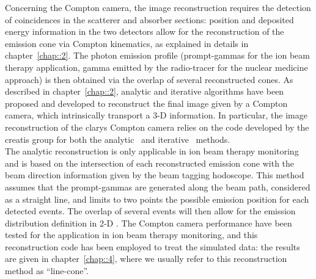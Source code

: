 Concerning the Compton camera, the image reconstruction requires the detection of coincidences in the scatterer and absorber sections: position and deposited energy information in the two detectors allow for the reconstruction of the emission cone via Compton kinematics, as explained in details in chapter~\ref{chap::2}. The photon emission profile (prompt-gammas for the ion beam therapy application, gamma emitted by the radio-tracer for the nuclear medicine approach) is then obtained via the overlap of several reconstructed cones. As described in chapter~\ref{chap::2}, analytic and iterative algorithms have been proposed and developed to reconstruct the final image given by a Compton camera, which intrinsically transport a 3-D information. In particular, the image reconstruction of the \gls{clarys} Compton camera relies on the code developed by the \gls{creatis} group for both the analytic~\parencite{Maxim2009} and iterative~\parencite{Lojacono2013, Maxim2014, Hilaire2014} methods.\\
The analytic reconstruction is only applicable in ion beam therapy monitoring and is based on the intersection of each reconstructed emission cone with the beam direction information given by the beam tagging hodoscope. This method assumes that the prompt-gammas are generated along the beam path, considered as a straight line, and limits to two points the possible emission position for each detected events. The overlap of several events will then allow for the emission distribution definition in 2-D . The Compton camera performance have been tested for the application in ion beam therapy monitoring, and this reconstruction code has been employed to treat the simulated data: the results are given in chapter~\ref{chap::4}, where we usually refer to this reconstruction method as \enquote{line-cone}.\\
